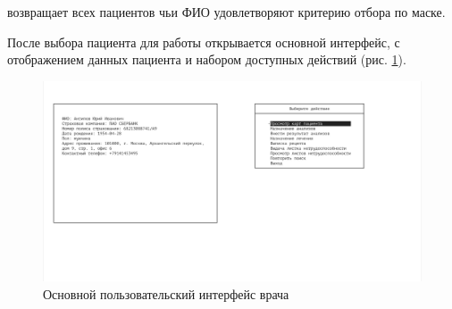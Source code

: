 \documentclass[14pt,a4paper,russian]{extreport}
\begin{document}
 возвращает всех пациентов чьи ФИО удовлетворяют критерию отбора по маске.\par
После выбора пациента для работы открывается основной интерфейс, с отображением данных пациента и набором доступных действий (рис. \ref{fig:doctor-interface}).\par\par
\begin{figure}[h!]
        \includegraphics[width=\textwidth]{prog_int/doctor-interface}
        \caption{Основной пользовательский интерфейс врача}
        \label{fig:doctor-interface}
\end{figure}
\end{document}
